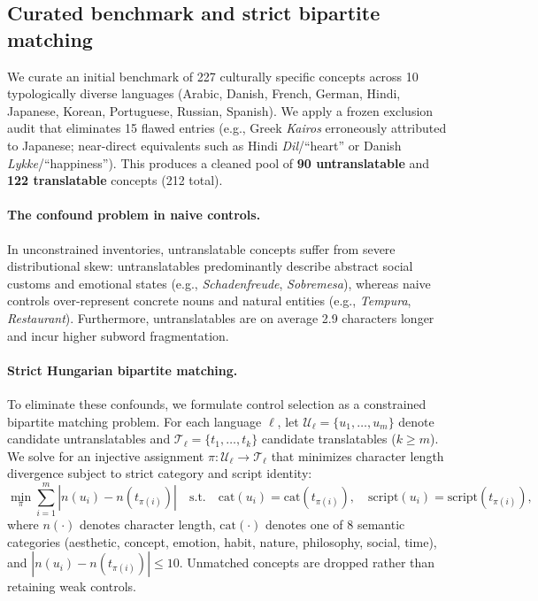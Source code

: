 \documentclass{article}
\begin{document}
\subsection{Curated benchmark and strict bipartite matching}
\label{sec:benchmark}

We curate an initial benchmark of 227 culturally specific concepts across 10 typologically diverse languages (Arabic, Danish, French, German, Hindi, Japanese, Korean, Portuguese, Russian, Spanish). We apply a frozen exclusion audit that eliminates 15 flawed entries (e.g., Greek \textit{Kairos} erroneously attributed to Japanese; near-direct equivalents such as Hindi \textit{Dil}/``heart'' or Danish \textit{Lykke}/``happiness''). This produces a cleaned pool of \textbf{90 untranslatable} and \textbf{122 translatable} concepts (212 total).

\paragraph{The confound problem in naive controls.}
In unconstrained inventories, untranslatable concepts suffer from severe distributional skew: untranslatables predominantly describe abstract social customs and emotional states (e.g., \textit{Schadenfreude}, \textit{Sobremesa}), whereas naive controls over-represent concrete nouns and natural entities (e.g., \textit{Tempura}, \textit{Restaurant}). Furthermore, untranslatables are on average 2.9 characters longer and incur higher subword fragmentation.

\paragraph{Strict Hungarian bipartite matching.}
To eliminate these confounds, we formulate control selection as a constrained bipartite matching problem. For each language $\ell$, let $\mathcal{U}_\ell = \{u_1, \dots, u_m\}$ denote candidate untranslatables and $\mathcal{T}_\ell = \{t_1, \dots, t_k\}$ candidate translatables ($k \ge m$). We solve for an injective assignment $\pi: \mathcal{U}_\ell \to \mathcal{T}_\ell$ that minimizes character length divergence subject to strict category and script identity:
\begin{equation}
\min_{\pi} \sum_{i=1}^m |n(u_i) - n(t_{\pi(i)})| \quad \text{s.t.} \quad \text{cat}(u_i) = \text{cat}(t_{\pi(i)}), \quad \text{script}(u_i) = \text{script}(t_{\pi(i)}),
\label{eq:hungarian}
\end{equation}
where $n(\cdot)$ denotes character length, $\text{cat}(\cdot)$ denotes one of 8 semantic categories (aesthetic, concept, emotion, habit, nature, philosophy, social, time), and $|n(u_i) - n(t_{\pi(i)})| \le 10$. Unmatched concepts are dropped rather than retaining weak controls.
\end{document}
